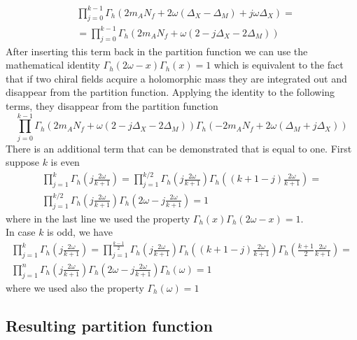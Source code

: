 \begin{equation}
\begin{aligned}
& \prod_{j=0}^{k-1} \Gamma_h \left( 2 m_A N_f + 2 \omega(\Delta_X - \Delta_M) + j \omega \Delta_X \right) =
\\&= \prod_{j=0}^{k-1} \Gamma_h \left( 2 m_A N_f + \omega( 2 -j \Delta_X  - 2 \Delta_M)\right) 
\end{aligned}
\end{equation}
After inserting this term back in the partition function we can use the mathematical identity $\Gamma_h (2 \omega - x) \Gamma_h(x) = 1$ 
which is equivalent to the fact that if two chiral fields acquire a holomorphic mass they are integrated out and disappear from the partition function.
Applying the identity to the following terms, they disappear from the partition function
\begin{equation}
\prod_{j=0}^{k-1} \Gamma_h \left( 2 m_A N_f + \omega( 2 -j \Delta_X  - 2 \Delta_M)\right) 
\Gamma_h \left(- 2 m_A N_f +  2 \omega( \Delta_M + j \Delta_X) \right) 
\end{equation}
There is an additional term that can be demonstrated that is equal to one.
First suppose $k$ is even
\begin{multline}
\prod_{j=1}^{k} \Gamma_h\left( j \frac{2 \omega }{k+1}  \right) = 
 \prod_{j=1}^{k/2} \Gamma_h\left( j \frac{2 \omega }{k+1} \right) \Gamma_h\left( (k+1-j )  \frac{2 \omega }{k+1} \right) =  \\
 \prod_{j=1}^{k/2} \Gamma_h\left( j \frac{2 \omega }{k+1} \right) \Gamma_h\left( 2 \omega - j \frac{2 \omega }{k+1} \right) = 1
 \end{multline}
where in the last line we used the property $\Gamma_h(x) \Gamma_h(2 \omega - x) = 1$.\\
In case $k $ is odd, we have
\begin{multline}
\prod_{j=1}^{k} \Gamma_h\left( j \frac{2 \omega }{k+1}  \right) = 
 \prod_{j=1}^{\frac{k-1}{2}} \Gamma_h\left( j \frac{2 \omega }{k+1} \right) \Gamma_h\left( (k+1-j )  \frac{2 \omega }{k+1} \right) \Gamma_h\left( \frac{k+1}{2} \frac{2 \omega }{k+1} \right) =  \\
 \prod_{j=1}^{n} \Gamma_h\left( j \frac{2 \omega }{k+1} \right) \Gamma_h\left( 2 \omega -j  \frac{2 \omega }{k+1} \right) \Gamma_h\left( \omega \right)  =  1
 \end{multline}
where we used also the property $\Gamma_h(\omega)=1$
\subsection{Resulting partition function}

